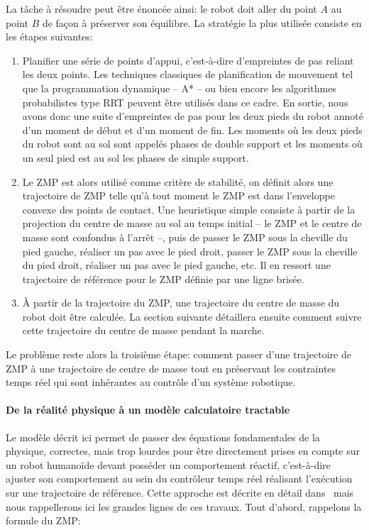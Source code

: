 La tâche à résoudre peut être énoncée ainsi: le robot doit aller du
point $A$ au point $B$ de façon à préserver son équilibre. La
stratégie la plus utilisée consiste en les étapes suivantes:
\begin{enumerate}
\item Planifier une série de points d'appui, c'est-à-dire d'empreintes
  de pas reliant les deux points. Les techniques classiques de
  planification de mouvement tel que la programmation dynamique -- A*
  -- ou bien encore les algorithmes probabilistes type RRT peuvent
  être utilisés dans ce cadre. En sortie, nous avons donc une suite
  d'empreintes de pas pour les deux pieds du robot annoté d'un moment
  de début et d'un moment de fin. Les moments où les deux pieds du
  robot sont au sol sont appelés phases de double support et les
  moments où un seul pied est au sol les phases de simple support.
\item Le ZMP est alors utilisé comme
  critère de stabilité, on définit alors une trajectoire de ZMP telle
  qu'à tout moment le ZMP est dans l'enveloppe convexe des points de
  contact. Une heuristique simple consiste à partir de la projection
  du centre de masse au sol au temps initial -- le ZMP et le centre de
  masse sont confondus à l'arrêt --, puis de passer le ZMP sous la
  cheville du pied gauche, réaliser un pas avec le pied droit, passer
  le ZMP sous la cheville du pied droit, réaliser un pas avec le pied
  gauche, etc. Il en ressort une trajectoire de référence pour le ZMP
  définie par une ligne brisée.
\item À partir de la trajectoire du ZMP, une trajectoire du centre de
  masse du robot doit être calculée. La section suivante détaillera
  ensuite comment suivre cette trajectoire du centre de masse pendant
  la marche.
\end{enumerate}

Le problème reste alors la troisième étape: comment passer d'une
trajectoire de ZMP à une trajectoire de centre de masse tout en
préservant les contraintes temps réel qui sont inhérantes au contrôle
d'un système robotique.

\paragraph{De la réalité physique à un modèle calculatoire tractable}


Le modèle décrit ici permet de passer des équations fondamentales de
la physique, correctes, mais trop lourdes pour être directement prises
en compte sur un robot humanoïde devant posséder un comportement
réactif, c'est-à-dire ajuster son comportement au sein du contrôleur
temps réel réalisant l'exécution sur une trajectoire de
référence. Cette approche est décrite en détail
dans \cite{10perrin.icra} mais nous rappellerons ici les grandes lignes
de ces travaux. Tout d'abord, rappelons la formule du ZMP:

